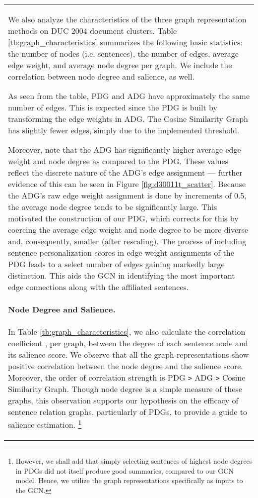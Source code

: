 \documentclass[11pt,a4paper]{article}
\begin{document}
\begin{table}[]
\begin{tabular}{l}
We also analyze the characteristics of the three graph representation methods on DUC 2004 document clusters.
Table \ref{tb:graph_characteristics} summarizes the following basic statistics: 
the number of nodes (i.e. sentences), the number of edges, average edge weight, and average node degree per graph. We include the correlation between node degree and salience, as well.

As seen from the table, PDG and ADG have approximately the same number of edges. This is expected since the PDG is built by transforming the edge weights in ADG. The Cosine Similarity Graph has slightly fewer edges, simply due to the implemented threshold.

Moreover, note that the ADG has significantly higher average edge weight and node degree as compared to the PDG. These values reflect the discrete nature of the ADG's edge assignment --- further evidence of this can be seen in Figure \ref{fig:d30011t_scatter}. Because the ADG's raw edge weight assignment is done by increments of 0.5, the average node degree tends to be significantly large. This motivated the construction of our PDG, which corrects for this by coercing the average edge weight and node degree to be more diverse and, consequently, smaller (after rescaling).
The process of including sentence personalization scores in edge weight assignments of the PDG leads to a select number of edges gaining markedly large distinction. This aids the GCN in identifying the most important edge connections along with the affiliated sentences.


\paragraph{Node Degree and Salience.}
In Table \ref{tb:graph_characteristics}, we also calculate the correlation coefficient , per graph, between the degree of each sentence node and its salience score.
We observe that all the graph representations show positive correlation between the node degree and the salience score.
Moreover, the order of correlation strength is PDG \verb|>| ADG  \verb|>| Cosine Similarity Graph.
Though node degree is a simple measure of these graphs, this observation supports our hypothesis on the efficacy of sentence relation graphs, particularly of PDGs, to provide a guide to salience estimation.
\footnote{
However, we shall add that simply selecting sentences of highest node degrees in PDGs did not itself produce good summaries, compared to our GCN model. Hence, we utilize the graph representations specifically as inputs to the GCN.}


\end{tabular}
\end{table}
\end{document}
